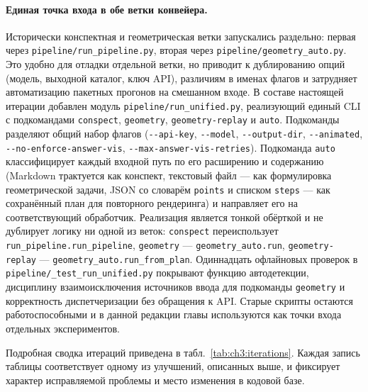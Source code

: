 \paragraph{Единая точка входа в обе ветки конвейера.} Исторически конспектная и геометрическая ветки запускались раздельно: первая через \texttt{pipeline/run\_pipeline.py}, вторая через \texttt{pipeline/geometry\_auto.py}. Это удобно для отладки отдельной ветки, но приводит к дублированию опций (модель, выходной каталог, ключ API), различиям в именах флагов и затрудняет автоматизацию пакетных прогонов на смешанном входе. В составе настоящей итерации добавлен модуль \texttt{pipeline/run\_unified.py}, реализующий единый CLI с подкомандами \texttt{conspect}, \texttt{geometry}, \texttt{geometry-replay} и \texttt{auto}. Подкоманды разделяют общий набор флагов (\texttt{-{}-api-key}, \texttt{-{}-model}, \texttt{-{}-output-dir}, \texttt{-{}-animated}, \texttt{-{}-no-enforce-answer-vis}, \texttt{-{}-max-answer-vis-retries}). Подкоманда \texttt{auto} классифицирует каждый входной путь по его расширению и содержанию (Markdown трактуется как конспект, текстовый файл --- как формулировка геометрической задачи, JSON со словарём \texttt{points} и списком \texttt{steps} --- как сохранённый план для повторного рендеринга) и направляет его на соответствующий обработчик. Реализация является тонкой обёрткой и не дублирует логику ни одной из веток: \texttt{conspect} переиспользует \texttt{run\_pipeline.run\_pipeline}, \texttt{geometry} --- \texttt{geometry\_auto.run}, \texttt{geometry-replay} --- \texttt{geometry\_auto.run\_from\_plan}. Одиннадцать офлайновых проверок в \texttt{pipeline/\_test\_run\_unified.py} покрывают функцию автодетекции, дисциплину взаимоисключения источников ввода для подкоманды \texttt{geometry} и корректность диспетчеризации без обращения к API. Старые скрипты остаются работоспособными и в данной редакции главы используются как точки входа отдельных экспериментов.

Подробная сводка итераций приведена в табл.~\ref{tab:ch3:iterations}. Каждая запись таблицы соответствует одному из улучшений, описанных выше, и фиксирует характер исправляемой проблемы и место изменения в кодовой базе.

